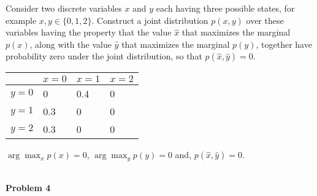 \documentclass{article}
\begin{document}
Consider two discrete variables $x$ and $y$ each having three possible states, for example $x, y \in \{0, 1, 2\}$. 
Construct a joint distribution $p(x, y)$ over these variables having the property that the value $\hat{x}$ that 
maximizes the marginal $p(x)$, along with the value $\hat{y}$ that maximizes the marginal $p(y)$, together have 
probability zero under the joint distribution, so that $p(\hat{x},\hat{y}) = 0$.
\color{blue}
\begin{sol}
    \begin{table}[h]
        \begin{tabular}{llll}
        \hline
        {\color[HTML]{3531FF} }        & {\color[HTML]{3531FF} $x=0$} & {\color[HTML]{3531FF} $x=1$} & {\color[HTML]{3531FF} $x=2$} \\ \hline
        {\color[HTML]{3531FF} $y=0$}   & {\color[HTML]{3531FF} 0}     & {\color[HTML]{3531FF} 0.4}   & {\color[HTML]{3531FF} 0}     \\
        {\color[HTML]{3531FF} $y = 1$} & {\color[HTML]{3531FF} 0.3}   & {\color[HTML]{3531FF} 0}     & {\color[HTML]{3531FF} 0}     \\
        {\color[HTML]{3531FF} $y=2$}   & {\color[HTML]{3531FF} 0.3}   & {\color[HTML]{3531FF} 0}     & {\color[HTML]{3531FF} 0}     \\ \hline
        \end{tabular}
        \end{table}
        $\arg\max_x p(x) = 0$, $\arg\max_y p(y) = 0$ and, $p(\hat{x},\hat{y}) = 0$.
\end{sol}
\color{black}
\leavevmode\\
\newpage
\noindent
\Large{\textbf{Problem 4}}\normalsize
\\
\end{document}
